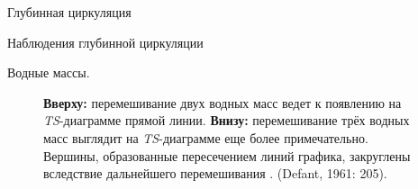 \begin{chapter}{Глубинная циркуляция}
\begin{section}{Наблюдения глубинной циркуляции}
\begin{paragraph}{Водные массы.}
\begin{figure}[t!]
\caption{\textbf{Вверху:} перемешивание двух водных масс ведет к появлению
на \emph{TS}-диаграмме прямой линии. 
\textbf{Внизу:} перемешивание трёх водных масс выглядит на \emph{TS}-диаграмме
еще более примечательно. Вершины, образованные пересечением линий графика,
закруглены вследствие дальнейшего перемешивания%
. (Defant, 1961: 205).}
\label{fig:TSsketch}
\end{figure}
%


\end{paragraph}
\end{section}
\end{chapter}
